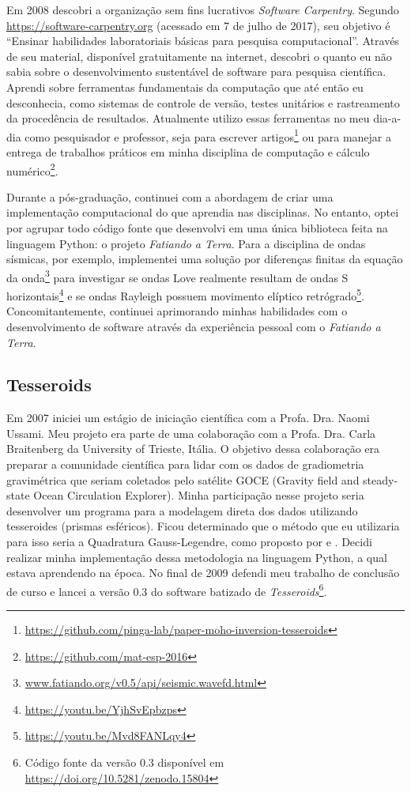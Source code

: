 \documentclass[12pt,a4paper,oneside,titlepage,onecolumn]{article}
\begin{document}
Em 2008 descobri a organização sem fins lucrativos \textit{Software Carpentry}.
Segundo \url{https://software-carpentry.org} (acessado em 7 de julho de 2017),
seu objetivo é ``Ensinar habilidades laboratoriais básicas para pesquisa
computacional''.
Através de seu material, disponível gratuitamente na internet, descobri o
quanto eu não sabia sobre o desenvolvimento sustentável de software para
pesquisa científica.
Aprendi sobre ferramentas fundamentais da computação que até então eu
desconhecia, como sistemas de controle de versão, testes unitários e
rastreamento da procedência de resultados.
Atualmente utilizo essas ferramentas no meu dia-a-dia como pesquisador e
professor, seja para escrever
artigos\footnote{\url{https://github.com/pinga-lab/paper-moho-inversion-tesseroids}}
ou para manejar a entrega de trabalhos práticos em minha disciplina de
computação e cálculo numérico\footnote{\url{https://github.com/mat-esp-2016}}.

Durante a pós-graduação, continuei com a abordagem de criar uma implementação
computacional do que aprendia nas disciplinas.
No entanto, optei por agrupar todo código fonte que desenvolvi em uma única
biblioteca feita na linguagem Python: o projeto \textit{Fatiando a Terra}.
Para a disciplina de ondas sísmicas, por exemplo, implementei uma solução por
diferenças finitas da equação da
onda\footnote{\url{www.fatiando.org/v0.5/api/seismic.wavefd.html}} para
investigar se ondas Love realmente resultam de ondas S
horizontais\footnote{\url{https://youtu.be/YjhSvEpbzps}} e se ondas Rayleigh
possuem movimento elíptico
retrógrado\footnote{\url{https://youtu.be/Mvd8FANLqy4}}.
Concomitantemente, continuei aprimorando minhas habilidades com o
desenvolvimento de software através da experiência pessoal com o
\textit{Fatiando a Terra}.



\subsection{Tesseroids}

Em 2007 iniciei um estágio de iniciação científica com a Profa. Dra. Naomi
Ussami.
Meu projeto era parte de uma colaboração com a Profa. Dra. Carla Braitenberg da
University of Trieste, Itália.
O objetivo dessa colaboração era preparar a comunidade científica para lidar
com os dados de gradiometria gravimétrica que seriam coletados pelo satélite
GOCE (Gravity field and steady-state Ocean Circulation Explorer).
Minha participação nesse projeto seria desenvolver um programa para a modelagem
direta dos dados utilizando tesseroides (prismas esféricos).
Ficou determinado que o método que eu utilizaria para isso seria a Quadratura
Gauss-Legendre, como proposto por \citet{asgharzadeh2007} e
\citet{wild-pfeiffer2008}.
Decidi realizar minha implementação dessa metodologia na linguagem Python, a
qual estava aprendendo na época.
No final de 2009 defendi meu trabalho de conclusão de curso e lancei a versão
0.3 do software batizado de \textit{Tesseroids}\footnote{Código fonte da versão
0.3 disponível em \url{https://doi.org/10.5281/zenodo.15804}}.
\end{document}
